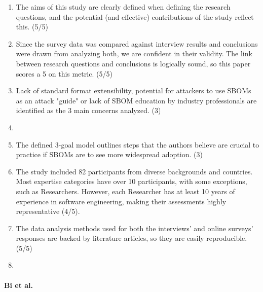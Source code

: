 \begin{enumerate}
    \item The aims of this study are clearly defined when defining the research questions, and the potential (and effective) contributions of the study reflect this. (5/5)
    \item Since the survey data was compared against interview results and conclusions were drawn from analyzing both, we are confident in their validity. The link between research questions and conclusions is logically sound, so this paper scores a 5 on this metric. (5/5)
    \item Lack of standard format extensibility, potential for attackers to use SBOMs as an attack "guide" or lack of SBOM education by industry professionals are identified as the 3 main concerns analyzed. (3)
    \item %
    \item The defined 3-goal model outlines steps that the authors believe are crucial to practice if SBOMs are to see more widespread adoption. (3)
    \item The study included 82 participants from diverse backgrounds and countries. Most expertise categories have over 10 participants, with some exceptions, such as Researchers. However, each Researcher has at least 10 years of experience in software engineering, making their assessments highly representative (4/5).
    \item The data analysis methods used for both the interviews' and online surveys' responses are backed by literature articles, so they are easily reproducible. (5/5)
    \item %
\end{enumerate}

\paragraph{Bi et al. \cite{article:sboms-issues-solutions}}

